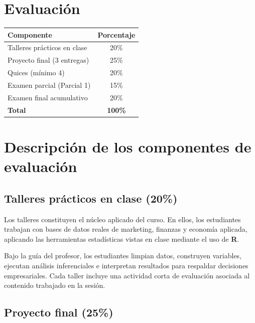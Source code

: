 \documentclass[
  11pt,
]{article}
\begin{document}
\hypertarget{evaluaciuxf3n}{%
\section{Evaluación}\label{evaluaciuxf3n}}

\begin{longtable}[]{@{}lc@{}}
\toprule\noalign{}
Componente & Porcentaje \\
\midrule\noalign{}
\endhead
\bottomrule\noalign{}
\endlastfoot
Talleres prácticos en clase & 20\% \\
Proyecto final (3 entregas) & 25\% \\
Quices (mínimo 4) & 20\% \\
Examen parcial (Parcial 1) & 15\% \\
Examen final acumulativo & 20\% \\
\textbf{Total} & \textbf{100\%} \\
\end{longtable}

\hypertarget{descripciuxf3n-de-los-componentes-de-evaluaciuxf3n}{%
\section{Descripción de los componentes de
evaluación}\label{descripciuxf3n-de-los-componentes-de-evaluaciuxf3n}}

\hypertarget{talleres-pruxe1cticos-en-clase-20}{%
\subsection{Talleres prácticos en clase
(20\%)}\label{talleres-pruxe1cticos-en-clase-20}}

Los talleres constituyen el núcleo aplicado del curso. En ellos, los
estudiantes trabajan con bases de datos reales de marketing, finanzas y
economía aplicada, aplicando las herramientas estadísticas vistas en
clase mediante el uso de \textbf{R}.

Bajo la guía del profesor, los estudiantes limpian datos, construyen
variables, ejecutan análisis inferenciales e interpretan resultados para
respaldar decisiones empresariales. Cada taller incluye una actividad
corta de evaluación asociada al contenido trabajado en la sesión.

\hypertarget{proyecto-final-25}{%
\subsection{Proyecto final (25\%)}\label{proyecto-final-25}}
\end{document}
